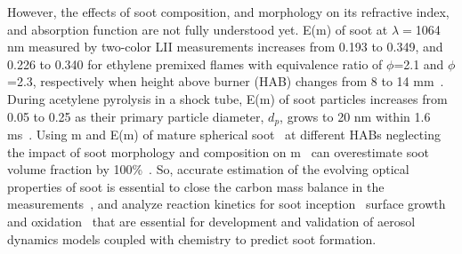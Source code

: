 However, the effects of soot composition, and morphology on its refractive index, and absorption function are not fully understood yet. E(m) of soot at $\lambda=$1064 nm measured by two-color LII measurements increases from 0.193 to 0.349, and 0.226 to 0.340 for ethylene premixed flames with equivalence ratio of $\phi$=2.1 and $\phi$=2.3, respectively when height above burner (HAB) changes from 8 to 14 mm~\citep{olofsson2015evolution}. During acetylene pyrolysis in a shock tube, E(m) of soot particles increases from 0.05 to 0.25 as their primary particle diameter, $d_p$, grows to 20 nm within 1.6 ms~\citep{eremin2011size}. Using m and E(m) of mature spherical soot~\citep{dalzell1969optical} at different HABs neglecting the impact of soot morphology and composition on m~\citep{zerbs2009influence} can overestimate soot volume fraction by 100\%~\citep{kelesidis2021determination}. So, accurate estimation of the evolving optical properties of soot is essential to close the carbon mass balance in the measurements~\citep{kelesidis2021determination}, and analyze reaction kinetics for soot inception~\citep{kholghy2018reactive} surface growth~\citep{appel2000kinetic} and oxidation~\citep{puduppakkam2014soot} that are essential for development and validation of aerosol dynamics models coupled with chemistry to predict soot formation.


